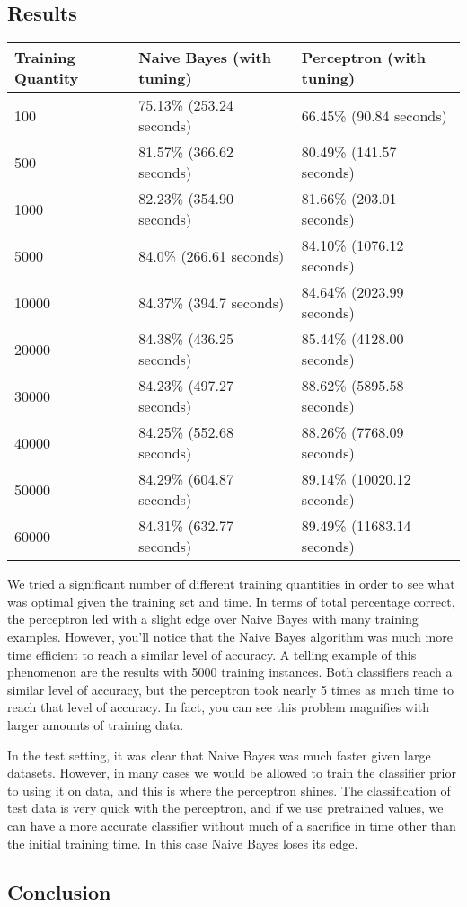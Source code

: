 \documentclass{article}
\theoremstyle{remark}
\begin{document}
     \subsection*{Results}
     \begin{table}[h!]
        \centering
        \begin{tabular}{l|l|l}
        Training Quantity & Naive Bayes (with tuning) & Perceptron (with tuning)   \\ \hline
        100               & 75.13\% (253.24 seconds)  & 66.45\% (90.84 seconds)    \\
        500               & 81.57\% (366.62 seconds)  & 80.49\% (141.57 seconds)   \\
        1000              & 82.23\% (354.90 seconds)  & 81.66\% (203.01 seconds)   \\
        5000              & 84.0\% (266.61 seconds)   & 84.10\% (1076.12 seconds)  \\
        10000             & 84.37\% (394.7 seconds)   & 84.64\% (2023.99 seconds)  \\
        20000             & 84.38\% (436.25 seconds)  & 85.44\% (4128.00 seconds)  \\
        30000             & 84.23\% (497.27 seconds)  & 88.62\% (5895.58 seconds)  \\
        40000             & 84.25\% (552.68 seconds)  & 88.26\% (7768.09 seconds)  \\
        50000             & 84.29\% (604.87 seconds)  & 89.14\% (10020.12 seconds) \\
        60000             & 84.31\% (632.77 seconds)  & 89.49\% (11683.14 seconds) \\
        \end{tabular}
     \end{table}
     We tried a significant number of different training quantities in order to see what was optimal given the training set and time. In terms of total percentage correct, the perceptron led with a slight edge over Naive Bayes with many training examples. However, you'll notice that the Naive Bayes algorithm was much more time efficient to reach a similar level of accuracy. A telling example of this phenomenon are the results with 5000 training instances. Both classifiers reach a similar level of accuracy, but the perceptron took nearly 5 times as much time to reach that level of accuracy. In fact, you can see this problem magnifies with larger amounts of training data.

     In the test setting, it was clear that Naive Bayes was much faster given large datasets. However, in many cases we would be allowed to train the classifier prior to using it on data, and this is where the perceptron shines. The classification of test data is very quick with the perceptron, and if we use pretrained values, we can have a more accurate classifier without much of a sacrifice in time other than the initial training time. In this case Naive Bayes loses its edge.
     \subsection*{Conclusion}



    
\end{document}
